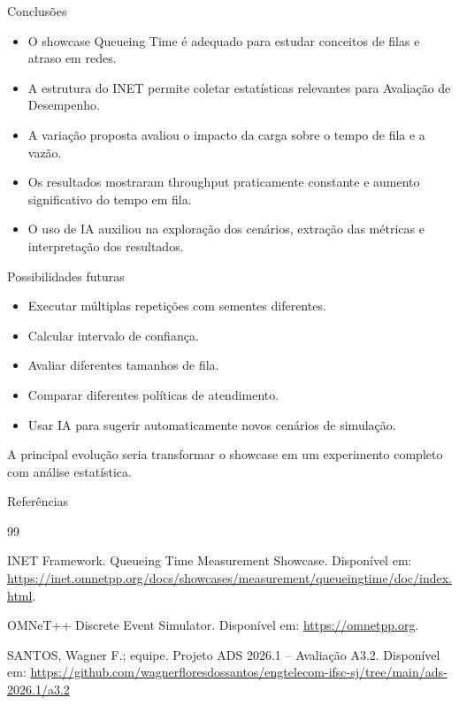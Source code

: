 \documentclass[aspectratio=169]{beamer}
\begin{document}
\begin{frame}{Conclusões}
\begin{itemize}
    \item O showcase Queueing Time é adequado para estudar conceitos de filas e atraso em redes.
    \item A estrutura do INET permite coletar estatísticas relevantes para Avaliação de Desempenho.
    \item A variação proposta avaliou o impacto da carga sobre o tempo de fila e a vazão.
    \item Os resultados mostraram throughput praticamente constante e aumento significativo do tempo em fila.
    \item O uso de IA auxiliou na exploração dos cenários, extração das métricas e interpretação dos resultados.
\end{itemize}
\end{frame}

\begin{frame}{Possibilidades futuras}
\begin{itemize}
    \item Executar múltiplas repetições com sementes diferentes.
    \item Calcular intervalo de confiança.
    \item Avaliar diferentes tamanhos de fila.
    \item Comparar diferentes políticas de atendimento.
    \item Usar IA para sugerir automaticamente novos cenários de simulação.
\end{itemize}

\begin{informacao}
A principal evolução seria transformar o showcase em um experimento completo com análise estatística.
\end{informacao}
\end{frame}

\begin{frame}{Referências}

\footnotesize

\begin{thebibliography}{99}

INET Framework. Queueing Time Measurement Showcase.
Disponível em: \url{https://inet.omnetpp.org/docs/showcases/measurement/queueingtime/doc/index.html}.

OMNeT++ Discrete Event Simulator.
Disponível em: \url{https://omnetpp.org}.

SANTOS, Wagner F.; equipe.
Projeto ADS 2026.1 – Avaliação A3.2.
Disponível em:
\url{https://github.com/wagnerfloresdossantos/engtelecom-ifsc-sj/tree/main/ads-2026.1/a3.2}

\end{thebibliography}

\end{frame}
\end{document}
